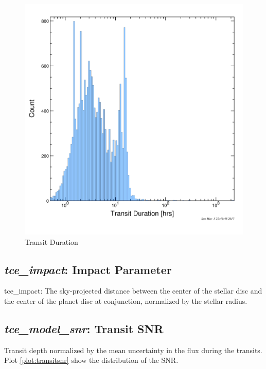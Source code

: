 \begin{figure}[!h]
\begin{center}
        \includegraphics[width=0.5\textheight]{img/transitduration.png}
        \caption{Transit Duration}  \label{plot:transitduration}
\end{center}
\end{figure}

\subsection{\emph{tce\_impact}: Impact Parameter}
tce\_impact: The sky-projected distance between the center of the stellar disc and the center of the planet disc at conjunction, normalized by the stellar radius.

\subsection{\emph{tce\_model\_snr}: Transit SNR}
Transit depth normalized by the mean uncertainty in the flux during the transits. Plot \ref{plot:transitsnr} show the distribution of the SNR. 

